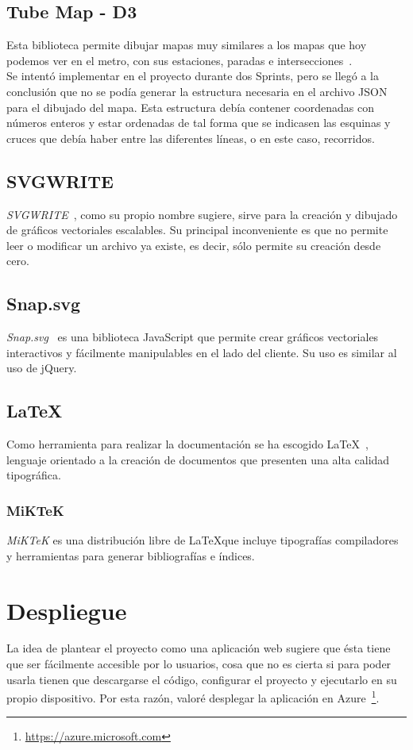 \subsection{Tube Map - D3}
Esta biblioteca permite dibujar mapas muy similares a los mapas que hoy podemos ver en el metro, con sus estaciones, paradas e intersecciones~\cite{doc:tubemap}.
\\
Se intentó implementar en el proyecto durante dos Sprints, pero se llegó a la conclusión que no se podía generar la estructura necesaria en el archivo JSON para el dibujado del mapa. Esta estructura debía contener coordenadas con números enteros y estar ordenadas de tal forma que se indicasen las esquinas y cruces que debía haber entre las diferentes líneas, o en este caso, recorridos.

\subsection{SVGWRITE}
\textit{SVGWRITE}~\cite{doc:svgwritedocs}, como su propio nombre sugiere, sirve para la creación y dibujado de gráficos vectoriales escalables. Su principal inconveniente es que no permite leer o modificar un archivo ya existe, es decir, sólo permite su creación desde cero.

\subsection{Snap.svg}
\textit{Snap.svg}~\cite{doc:snapsvg} es una biblioteca JavaScript que permite crear gráficos vectoriales interactivos y fácilmente manipulables en el lado del cliente. Su uso es similar al uso de jQuery.


\subsection{\LaTeX}
Como herramienta para realizar la documentación se ha escogido \LaTeX{}~\cite{wiki:latex}, lenguaje orientado a la creación de documentos que presenten una alta calidad tipográfica.

\subsubsection{MiKTeK}
\textit{MiKTeK} es una distribución libre de \LaTeX que incluye tipografías compiladores y herramientas para generar bibliografías e índices.


\section{Despliegue}
La idea de plantear el proyecto como una aplicación web sugiere que ésta tiene que ser fácilmente accesible por lo usuarios, cosa que no es cierta si para poder usarla tienen que descargarse el código, configurar el proyecto y ejecutarlo en su propio dispositivo. Por esta razón, valoré desplegar la aplicación en Azure~\footnote{\url{https://azure.microsoft.com}}.

